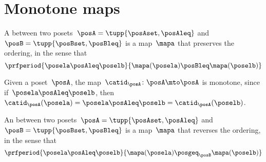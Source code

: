 
\section{Monotone maps}\label{sec:monotonicity-monotone-maps}


\begin{definition}
    \label{def:monotone}
    A \emph{} between two posets~$\posA=\tupp{\posAset, \posAleq}$ and~$\posB=\tupp{\posBset, \posBleq}$ is a map~$\mapa$ that preserves the ordering, in the sense that
    \begin{equation*}
        \prfperiod{
            \posela \posAleq \poselb
        }{
            \mapa(\posela) \posBleq \mapa(\poselb)
        }
    \end{equation*}
\end{definition}

\begin{remark}
    Given a poset~$\posA$, the map~$\catid_{\posA}\colon \posA \mto \posA$ is monotone, since if~$\posela\posAleq \poselb$, then~$\catid_{\posA}(\posela)=\posela \posAleq  \poselb =  \catid_{\posA}(\poselb )$.
\end{remark}

\begin{definition}
    \label{def:antitone}
    An \emph{} between two posets~$\posA=\tupp{\posAset, \posAleq}$ and~$\posB=\tupp{\posBset, \posBleq}$ is a map~$\mapa$ that reverses the ordering, in the sense that
    \begin{equation*}
        \prfperiod{
            \posela \posAleq \poselb
        }{
            \mapa(\posela) \posgeq_\posB \mapa(\poselb)
        }
    \end{equation*}
\end{definition}

